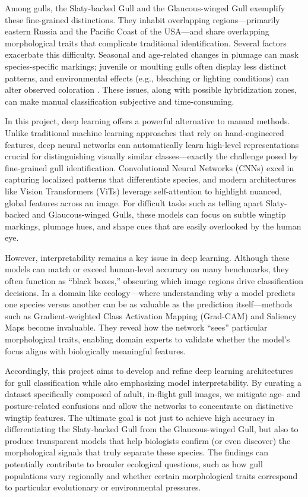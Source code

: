 Among gulls, the Slaty-backed Gull and the Glaucous-winged Gull exemplify these fine-grained distinctions. They inhabit overlapping regions—primarily eastern Russia and the Pacific Coast of the USA—and share overlapping morphological traits that complicate traditional identification. Several factors exacerbate this difficulty. Seasonal and age-related changes in plumage can mask species-specific markings; juvenile or moulting gulls often display less distinct patterns, and environmental effects (e.g., bleaching or lighting conditions) can alter observed coloration \cite{gull_variation}. These issues, along with possible hybridization zones, can make manual classification subjective and time-consuming.

In this project, deep learning offers a powerful alternative to manual methods. Unlike traditional machine learning approaches that rely on hand-engineered features, deep neural networks can automatically learn high-level representations crucial for distinguishing visually similar classes—exactly the challenge posed by fine-grained gull identification. Convolutional Neural Networks (CNNs) excel in capturing localized patterns that differentiate species, and modern architectures like Vision Transformers (ViTs) leverage self-attention to highlight nuanced, global features across an image. For difficult tasks such as telling apart Slaty-backed and Glaucous-winged Gulls, these models can focus on subtle wingtip markings, plumage hues, and shape cues that are easily overlooked by the human eye.

However, interpretability remains a key issue in deep learning. Although these models can match or exceed human-level accuracy on many benchmarks, they often function as ``black boxes,'' obscuring which image regions drive classification decisions. In a domain like ecology—where understanding why a model predicts one species versus another can be as valuable as the prediction itself—methods such as Gradient-weighted Class Activation Mapping (Grad-CAM) and Saliency Maps become invaluable. They reveal how the network ``sees'' particular morphological traits, enabling domain experts to validate whether the model's focus aligns with biologically meaningful features.

Accordingly, this project aims to develop and refine deep learning architectures for gull classification while also emphasizing model interpretability. By curating a dataset specifically composed of adult, in-flight gull images, we mitigate age- and posture-related confusions and allow the networks to concentrate on distinctive wingtip features. The ultimate goal is not just to achieve high accuracy in differentiating the Slaty-backed Gull from the Glaucous-winged Gull, but also to produce transparent models that help biologists confirm (or even discover) the morphological signals that truly separate these species. The findings can potentially contribute to broader ecological questions, such as how gull populations vary regionally and whether certain morphological traits correspond to particular evolutionary or environmental pressures.

